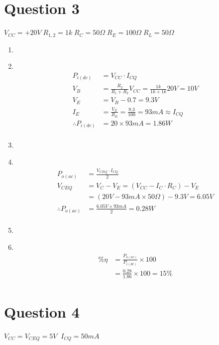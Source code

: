 \documentclass[11pt]{article}
\newcommand\Item[1][]{%
  \ifx\relax#1\relax  \item \else \item[#1] \fi
  \abovedisplayskip=0pt\abovedisplayshortskip=0pt~\vspace*{-\baselineskip}}
\begin{document}
\newpage
\section*{Question 3}
  $V_{CC} = +20V \; R_{1,2} = 1k \; R_C = 50\Omega \; R_E = 100\Omega \; R_L = 50\Omega$

  \begin{enumerate}[label=\roman*)]
    \Item %
      \begin{align*}
        P_{i(dc)} &= V_{CC}{\cdot}I_{CQ} \\
        V_{B} &= \frac{R_{2}}{R_{1}+R_{2}}V_{CC} = \frac{1k}{1k+1k}20V = 10V \\
        V_{E} &= V_{B} - 0.7 = 9.3V \\
        I_{E} &= \frac{V_{E}}{R_{E}} = \frac{9.3}{100} = 93mA \approx I_{CQ} \\
        \therefore P_{i(dc)} &= 20 \times 93mA = 1.86W \\
      \end{align*}

    \Item %
      \begin{align*}
        P_{o(ac)} &= \frac{V_{CEQ}{\cdot}I_{CQ}}{2} \\
        V_{CEQ}   &= V_{C} - V_{E} = (V_{CC} - I_{C}{\cdot}R_{C}) - V_{E} \\
                  &= (20V - 93mA \times 50\Omega) - 9.3V = 6.05V \\ 
        \therefore P_{o(ac)} &= \frac{6.05V \times 93mA}{2} = 0.28W \\
      \end{align*}

    \Item %
      \begin{align*}
        \% \eta &= \frac{P_{o(ac)}}{P_{i(dc)}} \times 100 \\
                &= \frac{0.28}{1.86} \times 100 = 15\%  \\
      \end{align*}
  \end{enumerate}


\section*{Question 4}
  $V_{CC}=V_{CEQ}=5V \;\; I_{CQ}=50mA$
\end{document}
